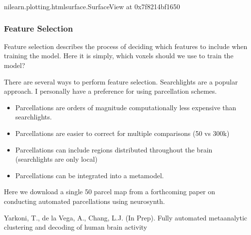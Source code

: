 \documentclass[letterpaper,10pt,english]{sphinxmanual}
\begin{document}
\begin{sphinxVerbatim}[commandchars=\\\{\}]
\PYG{p}{[}\PYG{p}{]}
\end{sphinxVerbatim}

\begin{sphinxVerbatim}[commandchars=\\\{\}]
\PYGZlt{}nilearn.plotting.html\PYGZus{}surface.SurfaceView at 0x7f8214bf1650\PYGZgt{}
\end{sphinxVerbatim}


\subsubsection{Feature Selection}
\label{\detokenize{content/Multivariate_Prediction:feature-selection}}
Feature selection describes the process of deciding which features to include when training the model.  Here it is simply, which voxels should we use to train the model?

There are several ways to perform feature selection.  Searchlights are a popular approach.  I personally have a preference for using parcellation schemes.
\begin{itemize}
\item {} 
Parcellations are orders of magnitude computationally less expensive than searchlights.

\item {} 
Parcellations are easier to correct for multiple comparisons (50 vs 300k)

\item {} 
Parcellations can include regions distributed throughout the brain (searchlights are only local)

\item {} 
Parcellations can be integrated into a meta\sphinxhyphen{}model.

\end{itemize}

Here we download a single 50 parcel map from a forthcoming paper on conducting automated parcellations using neurosynth.

\begin{sphinxVerbatim}[commandchars=\\\{\}]
Yarkoni, T., de la Vega, A., \PYGZam{} Chang, L.J. (In Prep).  Fully automated meta\PYGZhy{}analytic clustering and decoding of human brain activity
\end{sphinxVerbatim}
\end{document}
